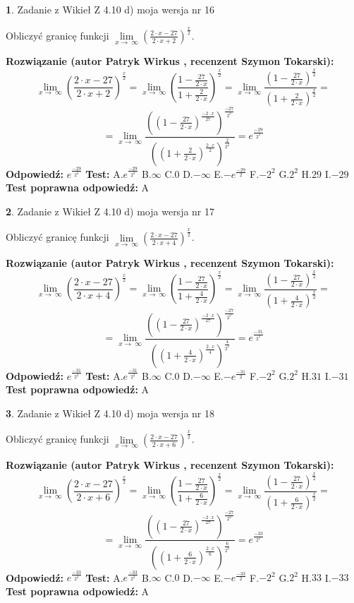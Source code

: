 \documentclass[12pt, a4paper]{article}
\theoremstyle{definition} %
\newtheorem{zad}{}
\newcommand{\zadStart}[1]{\begin{zad}#1\newline}
\newcommand{\zadStop}{\end{zad}}
\newcommand{\rozwStart}[2]{\noindent \textbf{Rozwiązanie (autor #1 , recenzent #2): }\newline}
\newcommand{\rozwStop}{\newline}
\newcommand{\odpStart}{\noindent \textbf{Odpowiedź:}\newline}
\newcommand{\odpStop}{\newline}
\newcommand{\testStart}{\noindent \textbf{Test:}\newline}
\newcommand{\testStop}{\newline}
\newcommand{\kluczStart}{\noindent \textbf{Test poprawna odpowiedź:}\newline}
\newcommand{\kluczStop}{\newline}
\begin{document}
\zadStart{Zadanie z Wikieł Z 4.10 d) moja wersja nr 16}


Obliczyć granicę funkcji  $\lim\limits_{x\to\ \infty}(\frac{2\cdot x-27}{2\cdot x+2})^{\frac{x}{2}}$.
\zadStop
\rozwStart{Patryk Wirkus}{Szymon Tokarski}
$$\lim\limits_{x\to\ \infty}(\frac{2\cdot x-27}{2\cdot x+2})^{\frac{x}{2}} = \lim\limits_{x\to\ \infty}(\frac{1-\frac{27}{2\cdot x}}{1+\frac{2}{2\cdot x}})^{\frac{x}{2}}=\lim\limits_{x\to\ \infty}\frac{(1-\frac{27}{2\cdot x})^{\frac{x}{2}}}{(1+\frac{2}{2\cdot x})^{\frac{x}{2}}}=$$
$$=\lim\limits_{x\to\ \infty}\frac{((1-\frac{27}{2\cdot x})^{\frac{-2\cdot x}{27}})^{\frac{-27}{2^{2}}}}{((1+\frac{2}{2\cdot x})^{\frac{2\cdot x}{2}})^{\frac{2}{2^{2}}}}=e^{\frac{-29}{2^{2}}}$$
\rozwStop
\odpStart
$e^{\frac{-29}{2^{2}}}$
\odpStop
\testStart
A.$e^{\frac{-29}{2^{2}}}$ B.$\infty$ C.$0$ D.$-\infty$ E.$-e^{\frac{-29}{2}}$
F.$-2^{2}$ G.$2^{2}$
H.$29$
I.$-29$
\testStop
\kluczStart
A
\kluczStop



\zadStart{Zadanie z Wikieł Z 4.10 d) moja wersja nr 17}


Obliczyć granicę funkcji  $\lim\limits_{x\to\ \infty}(\frac{2\cdot x-27}{2\cdot x+4})^{\frac{x}{2}}$.
\zadStop
\rozwStart{Patryk Wirkus}{Szymon Tokarski}
$$\lim\limits_{x\to\ \infty}(\frac{2\cdot x-27}{2\cdot x+4})^{\frac{x}{2}} = \lim\limits_{x\to\ \infty}(\frac{1-\frac{27}{2\cdot x}}{1+\frac{4}{2\cdot x}})^{\frac{x}{2}}=\lim\limits_{x\to\ \infty}\frac{(1-\frac{27}{2\cdot x})^{\frac{x}{2}}}{(1+\frac{4}{2\cdot x})^{\frac{x}{2}}}=$$
$$=\lim\limits_{x\to\ \infty}\frac{((1-\frac{27}{2\cdot x})^{\frac{-2\cdot x}{27}})^{\frac{-27}{2^{2}}}}{((1+\frac{4}{2\cdot x})^{\frac{2\cdot x}{4}})^{\frac{4}{2^{2}}}}=e^{\frac{-31}{2^{2}}}$$
\rozwStop
\odpStart
$e^{\frac{-31}{2^{2}}}$
\odpStop
\testStart
A.$e^{\frac{-31}{2^{2}}}$ B.$\infty$ C.$0$ D.$-\infty$ E.$-e^{\frac{-31}{2}}$
F.$-2^{2}$ G.$2^{2}$
H.$31$
I.$-31$
\testStop
\kluczStart
A
\kluczStop



\zadStart{Zadanie z Wikieł Z 4.10 d) moja wersja nr 18}


Obliczyć granicę funkcji  $\lim\limits_{x\to\ \infty}(\frac{2\cdot x-27}{2\cdot x+6})^{\frac{x}{2}}$.
\zadStop
\rozwStart{Patryk Wirkus}{Szymon Tokarski}
$$\lim\limits_{x\to\ \infty}(\frac{2\cdot x-27}{2\cdot x+6})^{\frac{x}{2}} = \lim\limits_{x\to\ \infty}(\frac{1-\frac{27}{2\cdot x}}{1+\frac{6}{2\cdot x}})^{\frac{x}{2}}=\lim\limits_{x\to\ \infty}\frac{(1-\frac{27}{2\cdot x})^{\frac{x}{2}}}{(1+\frac{6}{2\cdot x})^{\frac{x}{2}}}=$$
$$=\lim\limits_{x\to\ \infty}\frac{((1-\frac{27}{2\cdot x})^{\frac{-2\cdot x}{27}})^{\frac{-27}{2^{2}}}}{((1+\frac{6}{2\cdot x})^{\frac{2\cdot x}{6}})^{\frac{6}{2^{2}}}}=e^{\frac{-33}{2^{2}}}$$
\rozwStop
\odpStart
$e^{\frac{-33}{2^{2}}}$
\odpStop
\testStart
A.$e^{\frac{-33}{2^{2}}}$ B.$\infty$ C.$0$ D.$-\infty$ E.$-e^{\frac{-33}{2}}$
F.$-2^{2}$ G.$2^{2}$
H.$33$
I.$-33$
\testStop
\kluczStart
A
\kluczStop
\end{document}
